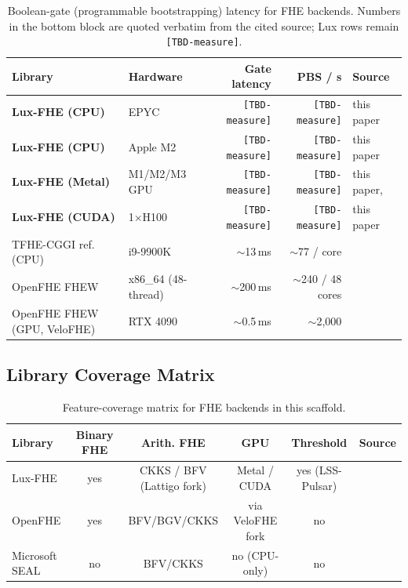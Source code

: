 \begin{table}[h]
\centering
\small
\begin{tabular}{@{}llrrl@{}}
\toprule
\textbf{Library} & \textbf{Hardware} & \textbf{Gate latency} & \textbf{PBS / s} & \textbf{Source} \\
\midrule
\textbf{Lux-FHE (CPU)} & EPYC          & \texttt{[TBD-measure]} & \texttt{[TBD-measure]} & this paper \\
\textbf{Lux-FHE (CPU)} & Apple M2      & \texttt{[TBD-measure]} & \texttt{[TBD-measure]} & this paper \\
\textbf{Lux-FHE (Metal)} & M1/M2/M3 GPU & \texttt{[TBD-measure]} & \texttt{[TBD-measure]} & this paper, \cite{luxevmgpu} \\
\textbf{Lux-FHE (CUDA)} & 1$\times$H100 & \texttt{[TBD-measure]} & \texttt{[TBD-measure]} & this paper \\
\midrule
TFHE-CGGI ref. (CPU)      & i9-9900K               & $\sim$13\,ms         & $\sim$77 / core           & \cite{cggi} \\
OpenFHE FHEW              & x86\_64 (48-thread)    & $\sim$200\,ms      & $\sim$240 / 48 cores       & \cite{velofhe2024} \\
OpenFHE FHEW (GPU, VeloFHE) & RTX 4090            & $\sim$0.5\,ms     & $\sim$2{,}000             & \cite{velofhe2024} \\
\bottomrule
\end{tabular}
\caption{Boolean-gate (programmable bootstrapping) latency for FHE
backends. Numbers in the bottom block are quoted verbatim from the
cited source; Lux rows remain \texttt{[TBD-measure]}.}
\label{tab:fhe-pbs-comparison}
\end{table}

\subsection{Library Coverage Matrix}

\begin{table}[h]
\centering
\small
\begin{tabular}{@{}lccccl@{}}
\toprule
\textbf{Library} & \textbf{Binary FHE} & \textbf{Arith. FHE} & \textbf{GPU} & \textbf{Threshold} & \textbf{Source} \\
\midrule
Lux-FHE        & yes       & CKKS / BFV (Lattigo fork) & Metal / CUDA       & yes (LSS-Pulsar) & \cite{lattigov7} \\
OpenFHE        & yes       & BFV/BGV/CKKS      & via VeloFHE fork   & no                & \cite{albadawi2022openfhe,velofhe2024} \\
Microsoft SEAL & no        & BFV/CKKS          & no (CPU-only)      & no                & \cite{microsoftseal} \\
\bottomrule
\end{tabular}
\caption{Feature-coverage matrix for FHE backends in this scaffold.}
\label{tab:fhe-coverage}
\end{table}


